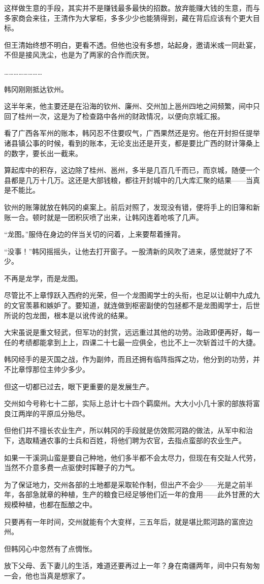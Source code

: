 这样做生意的手段，其实并不是赚钱最多最快的招数。放弃能赚大钱的生意，而与多家商会来往，王清作为大掌柜，多多少少也能猜得到，藏在背后应该有个更大目标。

但王清始终想不明白，更看不透。但他也没有多想，站起身，邀请米彧一同赴宴，不但是接风洗尘，也是为了两家的合作而庆贺。

……………………

韩冈刚刚抵达钦州。

这半年来，他主要还是在沿海的钦州、廉州、交州加上邕州四地之间频繁，间中只回了桂州一次，这是为了检查路中各州的财政情况，以便向京城汇报。

看了广西各军州的账本，韩冈忍不住要叹气，广西果然还是穷。他在开封担任提举诸县镇公事的时候，看到的账本，无论支出还是开支，都是要比广西的财计簿桑上的数字，要长出一截来。

算起库中的积存，这边除了桂州、邕州，多半是几百几千而已，而京城，随便一个县都是几万十几万。这还是大部钱粮，都往开封城中的几大库汇聚的结果——当真是不能比。

钦州的账簿就放在韩冈的桌案上。前后对照了，发现没有错，便将手上的旧簿和新账一合。顿时就是一团积灰喷了出来，让韩冈连着呛咳了几声。

“龙图。”服侍在身边的伴当关切的问着，上来要帮着捶背。

“没事！”韩冈摇摇头，让他去打开窗子。一股清新的风吹了进来，感觉就好了不少。

不再是龙学，而是龙图。

尽管比不上章惇跃入西府的光荣，但一个龙图阁学士的头衔，也足以让朝中九成九的文官羡慕和嫉妒了。要知道，就连做到枢密副使的包拯都不是龙图阁学士，后世所说的包龙图，根本是以讹传讹的结果。

大宋虽说是重文轻武，但军功的封赏，远远重过其他的功劳。治政即便再好，每一任的考绩都能拿到上上，四课二十七最一应俱全，也比不上一次斩首过千的大捷。

韩冈经手的是灭国之战，作为副帅，而且还拥有临阵指挥之功，他分到的功劳，并不比章惇那位主帅少多少。

但这一切都已过去，眼下更重要的是发展生产。

交州如今号称七十二部，实际上总计七十四个羁縻州。大大小小几十家的部族将富良江两岸的平原瓜分殆尽。

但他们并不擅长农业生产，所以韩冈的手段就是仿效熙河路的做法，从军中和治下，选取精通农事的士兵和百姓，将他们聘为农官，去指点蛮部的农业生产。

如果一干溪洞山蛮是要自己种地，他们多半都不会太尽力，但现在有交趾人代劳，当然不介意多费一点驱使时挥鞭子的力气。

为了保证地力，交州各部的土地都是采取轮作制，但出产不会少——光是之前半年，各部急就章的种植，生产的粮食已经足够他们近一年的食用——此外甘蔗的大规模种植，也都在酝酿之中。

只要再有一年时间，交州就能有个大变样，三五年后，就是堪比熙河路的富庶边州。

但韩冈心中忽然有了点惆怅。

放下父母、丢下妻儿的生活，难道还要再过上一年？身在南疆两年，间中只有匆匆一会，他也当真是想家了。

